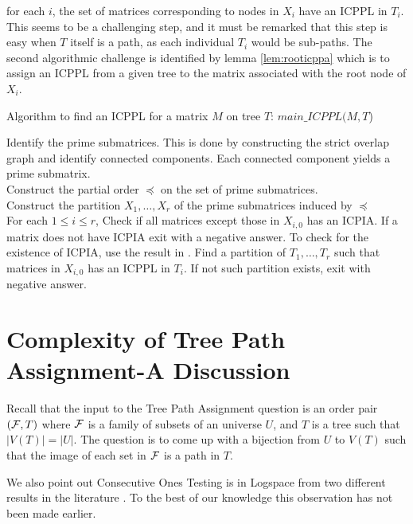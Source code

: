 for each $i$, the set of matrices corresponding to nodes in $X_i$ have
an ICPPL in $T_i$.  This seems to be a challenging step, and it must
be remarked that this step is easy when $T$ itself is a path, as each
individual $T_i$ would be sub-paths.  The second algorithmic challenge
is identified by lemma \ref{lem:rooticppa} which is to assign an ICPPL
from a given tree to the matrix associated with the root node of
$X_i$.
\begin{algorithm}[h]
  \caption{Algorithm to find an ICPPL for a matrix $M$ on tree $T$:
    $main\_ICPPL(M, T$)}
  \label{al:icppa-main}
  \begin{algorithmic}
    \STATE Identify the prime submatrices. This is done by
    constructing the strict overlap graph and identify connected
    components.  Each connected component yields a prime submatrix.
    \\ 
    \STATE Construct the partial order $\preccurlyeq$ on the set of
    prime submatrices.  \\ 
    \STATE Construct the partition $X_1,\ldots,X_r$ of the prime
    submatrices induced by $\preccurlyeq$ \\
    \STATE For each $1 \leq i \leq r$, Check if all matrices except
    those in $X_{i,0}$ has an ICPIA.  If a matrix does not have ICPIA
    exit with a negative answer.  To check for the existence of ICPIA,
    use the result in \cite{nsnrs09}.  \STATE Find a partition of
    $T_1, \ldots, T_r$ such that matrices in $X_{i,0}$ has an ICPPL in
    $T_i$.  If not such partition exists, exit with negative answer.
  \end{algorithmic}
\end{algorithm}


\section[Complexity]{Complexity of Tree Path Assignment-A Discussion}
\label{sec:tplcomplexity}
Recall that the input to the Tree Path Assignment question is an order
pair $({\cal F},T)$ where ${\cal F}$ is a family of subsets of an universe $U$,
and $T$ is a tree such that $|V(T)| = |U|$.  The question is to come
up with a bijection from $U$ to $V(T)$ such that the image of each set
in ${\cal F}$ is a path in $T$.


We also point out Consecutive Ones Testing is in Logspace from two
different results in the literature \cite{kklv10, mcc04}. To the best
of our knowledge this observation has not been made earlier.


